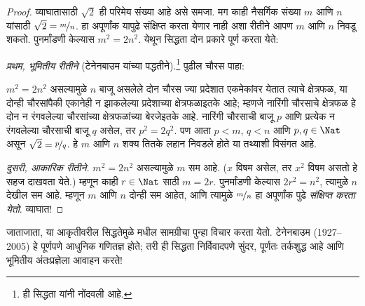\documentclass[../../../include/open-logic-section]{subfiles}
\begin{document}
\begin{proof}
व्याघातासाठी $\sqrt{2}$ ही परिमेय संख्या आहे असे समजा. मग काही नैसर्गिक
संख्या $m$ आणि $n$ यांसाठी $\sqrt{2} = \nicefrac{m}{n}$. हा अपूर्णांक
यापुढे संक्षिप्त करता येणार नाही अशा रीतीने आपण $m$ आणि $n$ निवडू शकतो.
पुनर्मांडणी केल्यास $m^{2} = 2n^{2}$. येथून सिद्धता दोन प्रकारे पूर्ण
करता येते:

\emph{प्रथम, भूमितीय रीतीने} (टेनेनबाउम यांच्या पद्धतीने).\footnote{ही
सिद्धता \cite{Conway2006} यांनी नोंदवली आहे.} पुढील चौरस पाहा:
\begin{center}
\end{center}
$m^2 = 2n^2$ असल्यामुळे $n$ बाजू असलेले दोन चौरस ज्या प्रदेशात
एकमेकांवर येतात त्याचे क्षेत्रफळ, या दोन्ही चौरसांपैकी एकानेही न झाकलेल्या
प्रदेशाच्या क्षेत्रफळाइतके आहे; म्हणजे नारिंगी चौरसाचे क्षेत्रफळ हे दोन
न रंगवलेल्या चौरसांच्या क्षेत्रफळांच्या बेरजेइतके आहे. नारिंगी चौरसाची
बाजू $p$ आणि प्रत्येक न रंगवलेल्या चौरसाची बाजू $q$ असेल, तर $p^2 =
2q^2$. पण आता $p < m$, $q < n$ आणि $p, q \in \Nat$ असून
$\sqrt{2} = \nicefrac{p}{q}$. हे $m$ आणि $n$ शक्य तितके लहान निवडले
होते या तथ्याशी विसंगत आहे.

\emph{दुसरी, आकारिक रीतीने.} $m^{2} = 2n^{2}$ असल्यामुळे $m$ सम आहे.
($x$ विषम असेल, तर $x^2$ विषम असतो हे सहज दाखवता येते.) म्हणून काही
$r \in \Nat$ साठी $m = 2r$. पुनर्मांडणी केल्यास $2r^2 = n^2$,
त्यामुळे $n$ देखील सम आहे. म्हणून $m$ आणि $n$ दोन्ही सम आहेत, आणि
त्यामुळे $\nicefrac{m}{n}$ हा अपूर्णांक पुढे \emph{संक्षिप्त करता येतो}.
व्याघात!
\end{proof}

जाताजाता, या आकृतीवरील सिद्धतेमुळे 
मधील सामग्रीचा पुन्हा विचार करता येतो. टेनेनबाउम (1927--2005) हे पूर्णपणे
आधुनिक गणितज्ञ होते; तरी ही सिद्धता निर्विवादपणे सुंदर, पूर्णतः तर्कशुद्ध
आहे आणि भूमितीय अंतःप्रज्ञेला आवाहन करते!
\end{document}

